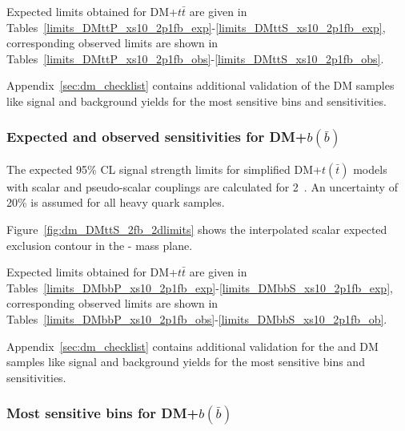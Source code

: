 

\clearpage
Expected limits obtained for DM+$t\bar{t}$ are given in Tables~\ref{limits_DMttP_xs10_2p1fb_exp}-\ref{limits_DMttS_xs10_2p1fb_exp}, corresponding observed limits are shown in Tables~\ref{limits_DMttP_xs10_2p1fb_obs}-\ref{limits_DMttS_xs10_2p1fb_obs}.







Appendix~\ref{sec:dm_checklist} contains additional validation of the \DMj DM samples like signal and background yields for the most sensitive bins and sensitivities.

\subsubsection{Expected and observed sensitivities for DM+$b(\bar{b})$}

The expected 95\% CL signal strength limits for simplified DM+$t(\bar{t})$ models with scalar and
pseudo-scalar couplings are calculated for 2~\ifb. An uncertainty of 20\% is assumed for all 
heavy quark samples.


Figure~\ref{fig:dm_DMttS_2fb_2dlimits} shows the interpolated scalar expected 
exclusion contour in the {\mphi-\mchi} mass plane.


\clearpage
Expected limits obtained for DM+$t\bar{t}$ are given in Tables~\ref{limits_DMbbP_xs10_2p1fb_exp}-\ref{limits_DMbbS_xs10_2p1fb_exp}, corresponding observed limits are shown in Tables~\ref{limits_DMbbP_xs10_2p1fb_obs}-\ref{limits_DMbbS_xs10_2p1fb_ob}.







Appendix~\ref{sec:dm_checklist} contains additional validation for the \DMtt and \DMtt DM samples like signal and background yields for the most sensitive bins and sensitivities.
\subsubsection{Most sensitive bins for DM+$b(\bar{b})$}
